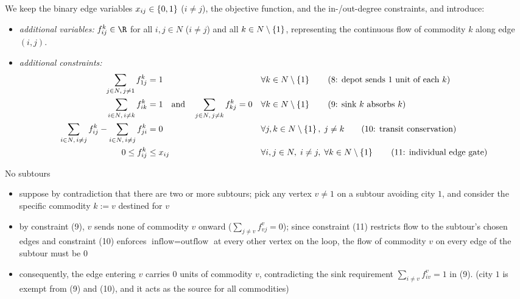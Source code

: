 \documentclass[a4paper, 11pt]{report}
\begin{document}
We keep the binary edge variables $x_{ij} \in \set{0,1}$ ($i \neq j$), the objective function, and the in-/out-degree constraints, and introduce:
\begin{itemize}
    \item \textit{additional variables:} $f_{ij}^k \in \R$ for all $i,j \in N$ ($i \neq j$) and all $k \in N \setminus \set{1}$, representing the continuous flow of commodity $k$ along edge $(i,j)$.
    \item \textit{additional constraints:}
    \begin{align*}
        \sum_{j \in N, \, j \neq 1} f_{1j}^k &= 1 && \forall k \in N \setminus \set{1} \tag{8: depot sends $1$ unit of each $k$} \\
        \sum_{i \in N, \, i \neq k} f_{ik}^k &= 1 \quad \text{and} \quad \sum_{j \in N, \, j \neq k} f_{kj}^k = 0 && \forall k \in N \setminus \set{1} \tag{9: sink $k$ absorbs $k$} \\
        \sum_{i \in N, \, i \neq j} f_{ij}^k - \sum_{i \in N, \, i \neq j} f_{ji}^k &= 0 && \forall j, k \in N \setminus \set{1}, \; j \neq k \tag{10: transit conservation} \\
        0 \leq f_{ij}^k &\leq x_{ij} && \forall i,j \in N, \; i \neq j, \; \forall k \in N \setminus \set{1} \tag{11: individual edge gate}
    \end{align*}
\end{itemize}

\begin{gframe}{No subtours}
\begin{itemize}
    \item suppose by contradiction that there are two or more subtours; pick any vertex $v \neq 1$ on a subtour avoiding city $1$, and consider the specific commodity $k := v$ destined for $v$
    \item by constraint (9), $v$ sends none of commodity $v$ onward ($\sum_{j \neq v} f_{vj}^v = 0$); since constraint (11) restricts flow to the subtour's chosen edges and constraint (10) enforces $\text{inflow} = \text{outflow}$ at every other vertex on the loop, the flow of commodity $v$ on every edge of the subtour must be $0$
    \item consequently, the edge entering $v$ carries $0$ units of commodity $v$, contradicting the sink requirement $\sum_{i \neq v} f_{iv}^v = 1$ in (9). (city $1$ is exempt from (9) and (10), and it acts as the source for all commodities)
\end{itemize}
\end{gframe}
\end{document}
